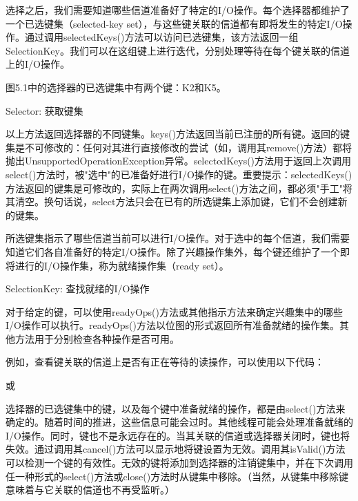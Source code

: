 	选择之后，我们需要知道哪些信道准备好了特定的I/O操作。每个选择器都维护了一个已选键集（selected-key set），与这些键关联的信道都有即将发生的特定I/O操作。通过调用selectedKeys()方法可以访问已选键集，该方法返回一组SelectionKey。我们可以在这组键上进行迭代，分别处理等待在每个键关联的信道上的I/O操作。

		

		图5.1中的选择器的已选键集中有两个键：K2和K5。

		Selector: 获取键集

		

		以上方法返回选择器的不同键集。keys()方法返回当前已注册的所有键。返回的键集是不可修改的：任何对其进行直接修改的尝试（如，调用其remove()方法）都将抛出UnsupportedOperationException异常。selectedKeys()方法用于返回上次调用select()方法时，被"选中"的已准备好进行I/O操作的键。重要提示：selectedKeys()方法返回的键集是可修改的，实际上在两次调用select()方法之间，都必须"手工"将其清空。换句话说，select方法只会在已有的所选键集上添加键，它们不会创建新的键集。

		所选键集指示了哪些信道当前可以进行I/O操作。对于选中的每个信道，我们需要知道它们各自准备好的特定I/O操作。除了兴趣操作集外，每个键还维护了一个即将进行的I/O操作集，称为就绪操作集（ready set）。

		SelectionKey: 查找就绪的I/O操作

		

		对于给定的键，可以使用readyOps()方法或其他指示方法来确定兴趣集中的哪些I/O操作可以执行。readyOps()方法以位图的形式返回所有准备就绪的操作集。其他方法用于分别检查各种操作是否可用。

		例如，查看键关联的信道上是否有正在等待的读操作，可以使用以下代码：

		

		或

		

		选择器的已选键集中的键，以及每个键中准备就绪的操作，都是由select()方法来确定的。随着时间的推进，这些信息可能会过时。其他线程可能会处理准备就绪的I/O操作。同时，键也不是永远存在的。当其关联的信道或选择器关闭时，键也将失效。通过调用其cancel()方法可以显示地将键设置为无效。调用其isValid()方法可以检测一个键的有效性。无效的键将添加到选择器的注销键集中，并在下次调用任一种形式的select()方法或close()方法时从键集中移除。（当然，从键集中移除键意味着与它关联的信道也不再受监听。）

